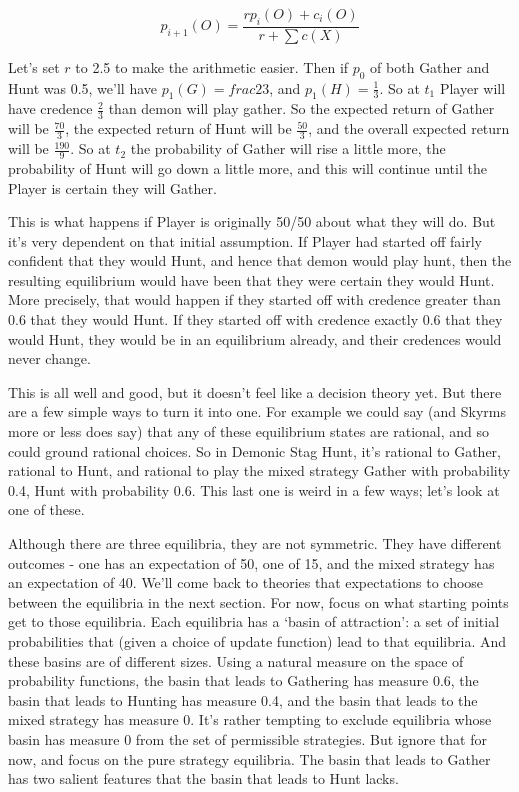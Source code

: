 \documentclass[
  12pt,
]{article}
\begin{document}
\[
p_{i+1}(O) = \frac{rp_i(O) + c_i(O)}{r + \sum c(X)}
\]

Let's set \(r\) to 2.5 to make the arithmetic easier. Then if \(p_0\) of
both Gather and Hunt was 0.5, we'll have \(p_1(G) = frac{2}{3}\), and
\(p_1(H) = \frac{1}{3}\). So at \(t_1\) Player will have credence
\(\frac{2}{3}\) than demon will play gather. So the expected return of
Gather will be \(\frac{70}{3}\), the expected return of Hunt will be
\(\frac{50}{3}\), and the overall expected return will be
\(\frac{190}{9}\). So at \(t_2\) the probability of Gather will rise a
little more, the probability of Hunt will go down a little more, and
this will continue until the Player is certain they will Gather.

This is what happens if Player is originally 50/50 about what they will
do. But it's very dependent on that initial assumption. If Player had
started off fairly confident that they would Hunt, and hence that demon
would play hunt, then the resulting equilibrium would have been that
they were certain they would Hunt. More precisely, that would happen if
they started off with credence greater than 0.6 that they would Hunt. If
they started off with credence exactly 0.6 that they would Hunt, they
would be in an equilibrium already, and their credences would never
change.

This is all well and good, but it doesn't feel like a decision theory
yet. But there are a few simple ways to turn it into one. For example we
could say (and Skyrms more or less does say) that any of these
equilibrium states are rational, and so could ground rational choices.
So in Demonic Stag Hunt, it's rational to Gather, rational to Hunt, and
rational to play the mixed strategy Gather with probability 0.4, Hunt
with probability 0.6. This last one is weird in a few ways; let's look
at one of these.

Although there are three equilibria, they are not symmetric. They have
different outcomes - one has an expectation of 50, one of 15, and the
mixed strategy has an expectation of 40. We'll come back to theories
that expectations to choose between the equilibria in the next section.
For now, focus on what starting points get to those equilibria. Each
equilibria has a `basin of attraction': a set of initial probabilities
that (given a choice of update function) lead to that equilibria. And
these basins are of different sizes. Using a natural measure on the
space of probability functions, the basin that leads to Gathering has
measure 0.6, the basin that leads to Hunting has measure 0.4, and the
basin that leads to the mixed strategy has measure 0. It's rather
tempting to exclude equilibria whose basin has measure 0 from the set of
permissible strategies. But ignore that for now, and focus on the pure
strategy equilibria. The basin that leads to Gather has two salient
features that the basin that leads to Hunt lacks.
\end{document}
